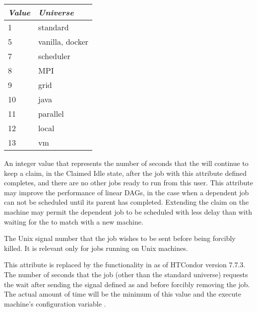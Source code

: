 \begin{description}
\begin{center}
\begin{table}[hbt]
\begin{tabular}{|p{2cm}p{3cm}|} \hline
\emph{Value} & \emph{Universe} \\ \hline \hline
1 & standard \\ \hline
5 & vanilla, docker \\ \hline
7 & scheduler \\ \hline
8 & MPI \\ \hline
9 & grid \\ \hline
10 & java \\ \hline
11 & parallel \\ \hline
12 & local \\ \hline
13 & vm \\ \hline
\end{tabular}
\end{table}
\end{center}

\item[\AdAttr{KeepClaimIdle}:]  An integer value that represents the number
of seconds that the  will continue to keep a claim,
in the Claimed Idle state,
after the job with this attribute defined completes, 
and there are no other jobs ready to run from this user.
This attribute may improve the performance of linear DAGs,
in the case when a dependent job can not be scheduled until its
parent has completed.
Extending the claim on the machine may permit the dependent job to be
scheduled with less delay than with waiting for the 
to match with a new machine. 

\item[\AdAttr{KillSig}:]  The Unix signal number that the job wishes to be
sent before being forcibly killed.
It is relevant only for jobs running on Unix machines.

\item[\AdAttr{KillSigTimeout}:]  This attribute is replaced by the
functionality in  as of HTCondor version 7.7.3.
The number of seconds that the job
(other than the standard universe) requests the  wait
after sending the signal defined as  and before forcibly
removing the job.
The actual amount of time will be the minimum of this value
and the execute machine's configuration variable .


\end{description}
